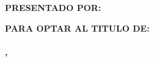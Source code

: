 \begingroup 


  \thispagestyle{empty}
  \begin{center}
    \textbf{\MakeUppercase{\UESuniversity}}\\[0.20cm]
    \textbf{\MakeUppercase{\UESfaculty}}\\[0.20cm]
    \textbf{\MakeUppercase{\UESschool}}\\[1.0cm]
    \begin{minipage}{0.50\textwidth}\centering
      \maybeincludegraphics[0.50\linewidth]{\UESlogopath}
    \end{minipage}\\[1.0cm]
    \textbf{\MakeUppercase{\UEStitle}}\\[0.20cm]
    \textbf{PRESENTADO POR:}\\[0.2cm]
    \typesetauthors\par\vspace{0.5cm}
    \textbf{PARA OPTAR AL TITULO DE:}\\[0.2cm]
    \textbf{\MakeUppercase{\UESdegree}}\\[0.2cm]
    \textbf{\MakeUppercase{\UEScity, \UESmonthyear}}
  \end{center}
  \clearpage

\endgroup